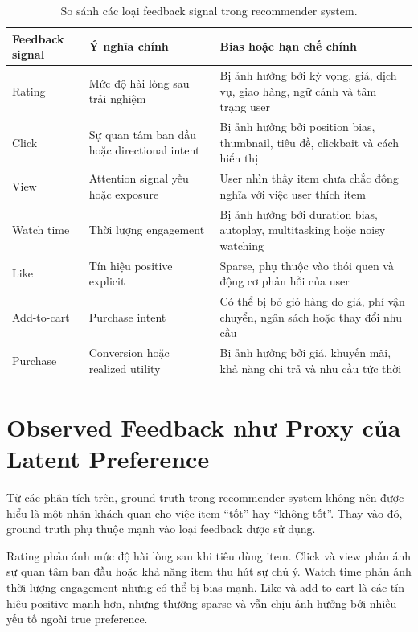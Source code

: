 \documentclass[12pt,a4paper]{article}
\begin{document}
\begin{table}[h!]
\centering
\small
\begin{tabular}{p{3cm} p{5cm} p{5cm}}
\toprule
\textbf{Feedback signal} & \textbf{Ý nghĩa chính} & \textbf{Bias hoặc hạn chế chính} \\
\midrule
Rating 
& Mức độ hài lòng sau trải nghiệm 
& Bị ảnh hưởng bởi kỳ vọng, giá, dịch vụ, giao hàng, ngữ cảnh và tâm trạng user \\

Click 
& Sự quan tâm ban đầu hoặc directional intent 
& Bị ảnh hưởng bởi position bias, thumbnail, tiêu đề, clickbait và cách hiển thị \\

View 
& Attention signal yếu hoặc exposure 
& User nhìn thấy item chưa chắc đồng nghĩa với việc user thích item \\

Watch time 
& Thời lượng engagement 
& Bị ảnh hưởng bởi duration bias, autoplay, multitasking hoặc noisy watching \\

Like 
& Tín hiệu positive explicit 
& Sparse, phụ thuộc vào thói quen và động cơ phản hồi của user \\

Add-to-cart 
& Purchase intent 
& Có thể bị bỏ giỏ hàng do giá, phí vận chuyển, ngân sách hoặc thay đổi nhu cầu \\

Purchase 
& Conversion hoặc realized utility 
& Bị ảnh hưởng bởi giá, khuyến mãi, khả năng chi trả và nhu cầu tức thời \\
\bottomrule
\end{tabular}
\caption{So sánh các loại feedback signal trong recommender system.}
\label{tab:feedback_signal_comparison}
\end{table}

\section{Observed Feedback như Proxy của Latent Preference}

Từ các phân tích trên, ground truth trong recommender system không nên được hiểu là một nhãn khách quan cho việc item ``tốt'' hay ``không tốt''. 
Thay vào đó, ground truth phụ thuộc mạnh vào loại feedback được sử dụng.

Rating phản ánh mức độ hài lòng sau khi tiêu dùng item. 
Click và view phản ánh sự quan tâm ban đầu hoặc khả năng item thu hút sự chú ý. 
Watch time phản ánh thời lượng engagement nhưng có thể bị bias mạnh. 
Like và add-to-cart là các tín hiệu positive mạnh hơn, nhưng thường sparse và vẫn chịu ảnh hưởng bởi nhiều yếu tố ngoài true preference.
\end{document}
